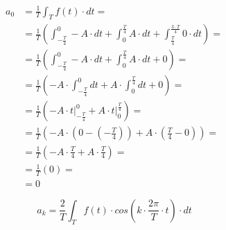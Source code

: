 \begin{task}

\begin{align*}
a_0 &=\frac{1}{T}\int_{T}f(t) \cdot dt =\\
&=\frac{1}{T} \left( \int_{-\frac{T}{4}}^{0} -A \cdot dt + 
\int_{0}^{\frac{T}{4}} A \cdot dt +
\int_{\frac{T}{4}}^{\frac{3\cdot T}{4}} 0 \cdot dt \right ) = \\
&=\frac{1}{T} \left( \int_{-\frac{T}{4}}^{0} -A \cdot dt + 
\int_{0}^{\frac{T}{4}} A \cdot dt + 0 \right ) = \\
&=\frac{1}{T} \left( -A \cdot \int_{-\frac{T}{4}}^{0} dt + 
A \cdot \int_{0}^{\frac{T}{4}} dt + 0 \right ) = \\
&=\frac{1}{T} \left( -A \cdot \left. t \right|_{-\frac{T}{4}}^{0} + 
A \cdot \left. t \right|_{0}^{\frac{T}{4}}\right ) = \\
&=\frac{1}{T} \left( -A \cdot \left( 0 - \left(-\frac{T}{4}\right) \right) + 
A \cdot \left( \frac{T}{4} - 0 \right)\right ) = \\
&=\frac{1}{T} \left( -A \cdot \frac{T}{4} + 
A \cdot \frac{T}{4}\right ) = \\
&=\frac{1}{T} \left( 0 \right ) = \\
&=0
\end{align*}




\begin{equation}
a_k=\frac{2}{T}\int_{T}f(t) \cdot cos\left( k \cdot \frac{2\pi}{T} \cdot t\right) \cdot dt
\end{equation}



\end{task}

